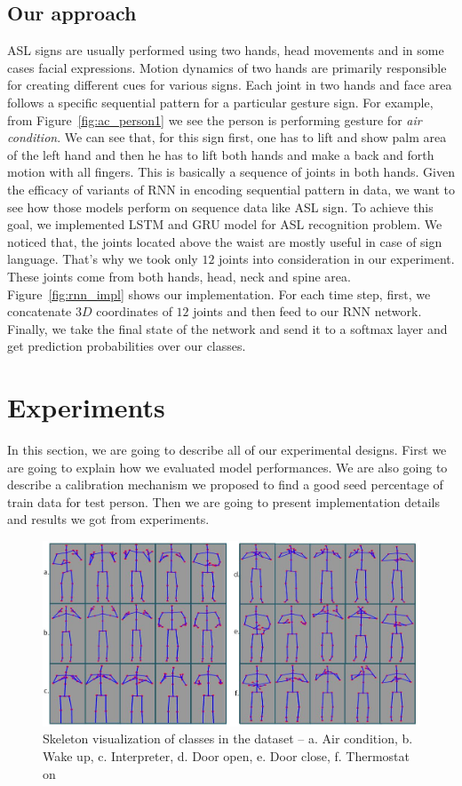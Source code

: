 \documentclass[10pt,twocolumn,letterpaper]{article}
\begin{document}
\subsection{Our approach}
ASL signs are usually performed using two hands, head movements and in some cases facial expressions. Motion dynamics of two hands are primarily responsible for creating different cues for various signs. Each joint in two hands and face area follows a specific sequential pattern for a particular gesture sign. For example, from Figure~\ref{fig:ac_person1} we see the person is performing gesture for \textit{air condition}. We can see that, for this sign first, one has to lift and show palm area of the left hand and then he has to lift both hands and make a back and forth motion with all fingers. This is basically a sequence of joints in both hands. Given the efficacy of variants of RNN in encoding sequential pattern in data, we want to see how those models perform on sequence data like ASL sign. To achieve this goal, we implemented LSTM and GRU model for ASL recognition problem. We noticed that, the joints located above the waist are mostly useful in case of sign language. That's why we took only $12$ joints into consideration in our experiment. These joints come from both hands, head, neck and spine area. Figure~\ref{fig:rnn_impl} shows our implementation. For each time step, first, we concatenate $3D$ coordinates of $12$ joints and then feed to our RNN network. Finally, we take the final state of the network and send it to a softmax layer and get prediction probabilities over our classes.
\section{Experiments}
In this section, we are going to describe all of our experimental designs. First we are going to explain how we evaluated model performances. We are also going to describe a calibration mechanism we proposed to find a good seed percentage of train data for test person. Then we are going to present implementation details and results we got from experiments. 
\begin{figure}[h]
	\begin{center}
		\includegraphics[width=.8\linewidth]{sk_data_viz}
	\end{center}
	\caption{Skeleton visualization of classes in the dataset -- a. Air condition, b. Wake up, c. Interpreter, d. Door open, e. Door close, f. Thermostat on}
	\label{fig:sk_dat_viz}
\end{figure}
\end{document}
